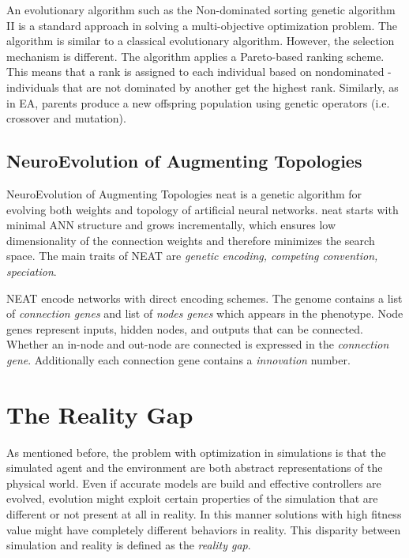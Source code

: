 An evolutionary algorithm such as the Non-dominated sorting genetic algorithm II \citep{deb200fast} is a standard approach in solving a multi-objective optimization problem. The algorithm is similar to a classical evolutionary algorithm. However, the selection mechanism is different. The algorithm applies a Pareto-based ranking scheme. This means that a rank is assigned to each individual based on nondominated - individuals that are not dominated by another get the highest rank. Similarly, as in EA, parents produce a new offspring population using genetic operators (i.e. crossover and mutation).

\subsection{NeuroEvolution of Augmenting Topologies}

NeuroEvolution of Augmenting Topologies \gls{neat} \citep{stanley2002evolving} is a genetic algorithm for evolving both weights and topology of artificial neural networks. \gls{neat} starts with minimal ANN structure and grows incrementally, which ensures low dimensionality of the connection weights and therefore minimizes the search space. The main traits of NEAT are \emph{genetic encoding, competing convention, speciation}.

NEAT encode networks with direct encoding schemes. The genome contains a list of \emph{connection genes} and list of \emph{nodes genes} which appears in the phenotype. Node genes represent inputs, hidden nodes, and outputs that can be connected. Whether an in-node and out-node are connected is expressed in the \emph{connection gene}. Additionally each connection gene contains a \emph{innovation} number.

\section{The Reality Gap}

As mentioned before, the problem with optimization in simulations is that the simulated agent and the environment are both abstract representations of the physical world. Even if accurate models are build and effective controllers are evolved, evolution might exploit certain properties of the simulation that are different or not present at all in reality. In this manner solutions with high fitness value might have completely different behaviors in reality. This disparity between simulation and reality is defined as the \emph{reality gap}.

